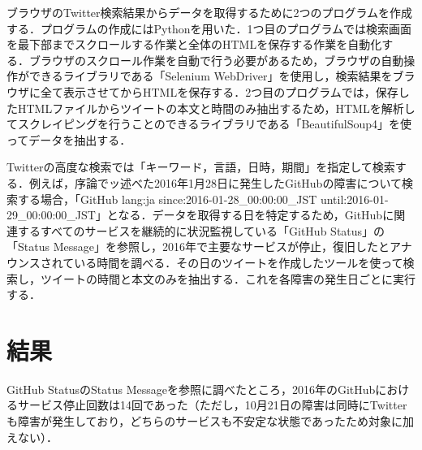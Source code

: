 \documentclass[uplatex,twocolumn]{jsarticle}
\begin{document}
ブラウザのTwitter検索結果からデータを取得するために2つのプログラムを作成する．プログラムの作成にはPythonを用いた．1つ目のプログラムでは検索画面を最下部までスクロールする作業と全体のHTMLを保存する作業を自動化する．ブラウザのスクロール作業を自動で行う必要があるため，ブラウザの自動操作ができるライブラリである「Selenium WebDriver」を使用し，検索結果をブラウザに全て表示させてからHTMLを保存する．2つ目のプログラムでは，保存したHTMLファイルからツイートの本文と時間のみ抽出するため，HTMLを解析してスクレイピングを行うことのできるライブラリである「BeautifulSoup4」を使ってデータを抽出する．

Twitterの高度な検索では「キーワード，言語，日時，期間」を指定して検索する．例えば，序論でッ述べた2016年1月28日に発生したGitHubの障害について検索する場合，「GitHub lang:ja since:2016-01-28\_00:00:00\_JST until:2016-01-29\_00:00:00\_JST」となる．データを取得する日を特定するため，GitHubに関連するすべてのサービスを継続的に状況監視している「GitHub Status」の「Status Message」を参照し，2016年で主要なサービスが停止，復旧したとアナウンスされている時間を調べる．その日のツイートを作成したツールを使って検索し，ツイートの時間と本文のみを抽出する．これを各障害の発生日ごとに実行する．

\section{結果}
GitHub StatusのStatus Messageを参照に調べたところ，2016年のGitHubにおけるサービス停止回数は14回であった（ただし，10月21日の障害は同時にTwitterも障害が発生しており，どちらのサービスも不安定な状態であったため対象に加えない）．
\end{document}

